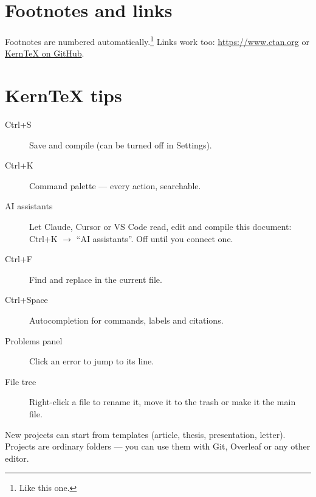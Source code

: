 \documentclass[11pt,a4paper]{article}
\begin{document}
\section{Footnotes and links}
Footnotes are numbered automatically.\footnote{Like this one.} Links work too:
\url{https://www.ctan.org} or \href{https://github.com/nicolasasauer/kerntex}{KernTeX on GitHub}.

\section{KernTeX tips}
\begin{description}
  \item[Ctrl+S] Save and compile (can be turned off in Settings).
  \item[Ctrl+K] Command palette --- every action, searchable.
  \item[AI assistants] Let Claude, Cursor or VS Code read, edit and compile
    this document: Ctrl+K $\rightarrow$ ``AI assistants''. Off until you connect one.
  \item[Ctrl+F] Find and replace in the current file.
  \item[Ctrl+Space] Autocompletion for commands, labels and citations.
  \item[Problems panel] Click an error to jump to its line.
  \item[File tree] Right-click a file to rename it, move it to the trash or
    make it the main file.
\end{description}
New projects can start from templates (article, thesis, presentation, letter).
Projects are ordinary folders --- you can use them with Git, Overleaf or any
other editor.

\printbibliography
\end{document}
